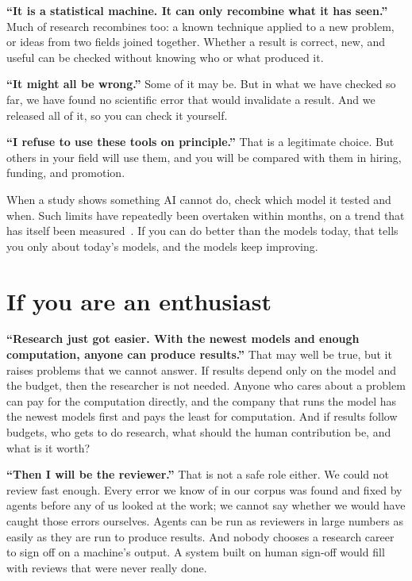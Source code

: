 \documentclass[11pt]{article}
\begin{document}
\textbf{``It is a statistical machine. It can only recombine what it has seen.''}
Much of research recombines too: a known technique applied to a new problem, or ideas from two fields joined together.
Whether a result is correct, new, and useful can be checked without knowing who or what produced it.

\textbf{``It might all be wrong.''}
Some of it may be.
But in what we have checked so far, we have found no scientific error that would invalidate a result.
And we released all of it, so you can check it yourself.

\textbf{``I refuse to use these tools on principle.''}
That is a legitimate choice.
But others in your field will use them, and you will be compared with them in hiring, funding, and promotion.

When a study shows something AI cannot do, check which model it tested and when.
Such limits have repeatedly been overtaken within months, on a trend that has itself been measured~\citep{kwa2025-measuring-ai-ability-to-complete}.
If you can do better than the models today, that tells you only about today's models, and the models keep improving.

\section*{If you are an enthusiast}

\textbf{``Research just got easier. With the newest models and enough computation, anyone can produce results.''}
That may well be true, but it raises problems that we cannot answer.
If results depend only on the model and the budget, then the researcher is not needed.
Anyone who cares about a problem can pay for the computation directly, and the company that runs the model has the newest models first and pays the least for computation.
And if results follow budgets, who gets to do research, what should the human contribution be, and what is it worth?

\textbf{``Then I will be the reviewer.''}
That is not a safe role either.
We could not review fast enough.
Every error we know of in our corpus was found and fixed by agents before any of us looked at the work; we cannot say whether we would have caught those errors ourselves.
Agents can be run as reviewers in large numbers as easily as they are run to produce results.
And nobody chooses a research career to sign off on a machine's output.
A system built on human sign-off would fill with reviews that were never really done.
\end{document}

